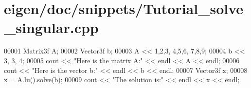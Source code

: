 \hypertarget{eigen_2doc_2snippets_2_tutorial__solve__singular_8cpp_source}{}\section{eigen/doc/snippets/\+Tutorial\+\_\+solve\+\_\+singular.cpp}
\label{eigen_2doc_2snippets_2_tutorial__solve__singular_8cpp_source}

\begin{DoxyCode}
00001 Matrix3f A;
00002 Vector3f b;
00003 A << 1,2,3,  4,5,6,  7,8,9;
00004 b << 3, 3, 4;
00005 cout << \textcolor{stringliteral}{"Here is the matrix A:"} << endl << A << endl;
00006 cout << \textcolor{stringliteral}{"Here is the vector b:"} << endl << b << endl;
00007 Vector3f x;
00008 x = A.lu().solve(b);
00009 cout << \textcolor{stringliteral}{"The solution is:"} << endl << x << endl;
\end{DoxyCode}
